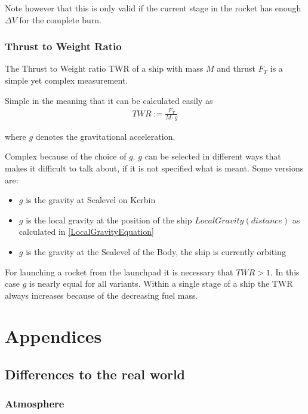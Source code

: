 \documentclass[11pt]{report}
\begin{document}
Note however that this is only valid if the current stage in the
rocket has enough $\Delta V$ for the complete burn.

\section{Thrust to Weight Ratio}

The Thrust to Weight ratio  TWR
\cite{KspTwr} of a ship with mass $M$ and thrust $F_T$ is a simple yet
complex measurement.

Simple in the meaning that it can be calculated easily
as
\begin{align}
  TWR := \frac{F_T}{M\cdot g}
\end{align}

where $g$ denotes the gravitational acceleration.

Complex because of the choice of $g$. $g$ can be selected in different
ways that makes it difficult to talk about, if it is not specified
what is meant. Some versions are:

\begin{itemize}
\item $g$ is the gravity at Sealevel on Kerbin
\item $g$ is the local gravity at the position of the ship
  $LocalGravity(distance)$ as calculated in
  \eqref{LocalGravityEquation}
\item $g$ is the gravity at the Sealevel of the Body, the ship is
  currently orbiting
\end{itemize}

For launching a rocket from the launchpad it is necessary that $TWR >
1$. In this case $g$ is nearly equal for all variants. Within a single
stage of a ship the TWR always increases because of the decreasing
fuel mass.

\part{Appendices}

\chapter{Differences to the real world}\label{RealWorldDifferences}

\section{Atmosphere}
\end{document}
